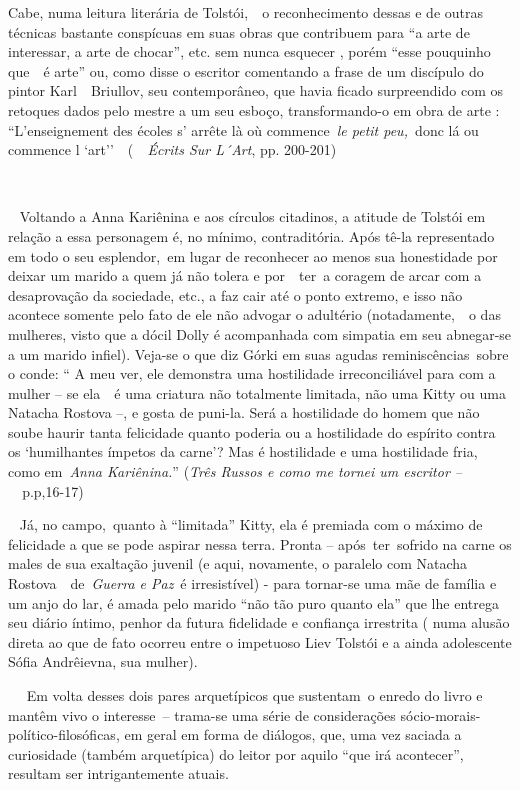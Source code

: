 Cabe, numa leitura literária de Tolstói,~~o reconhecimento dessas e de
outras técnicas bastante conspícuas em suas obras que contribuem para
``a arte de interessar, a arte de chocar'', etc. sem nunca esquecer ,
porém ``esse pouquinho que~~é arte'' ou, como disse o escritor
comentando a frase de um discípulo do pintor Karl~~Briullov, seu
contemporâneo, que havia ficado surpreendido com os retoques dados pelo
mestre a um seu esboço, transformando-o em obra de arte :
``L'enseignement des écoles s' arrête là où commence~\emph{le petit
peu,~}donc lá ou commence l `art''~~(~\emph{~Écrits Sur L´Art}, pp.
200-201)

~

~ Voltando a Anna Kariênina e aos círculos citadinos, a atitude de
Tolstói em relação a essa personagem é, no mínimo, contraditória. Após
tê-la representado em todo o seu esplendor,~em lugar de reconhecer ao
menos sua honestidade por deixar um marido a quem já não tolera e
por~~ter~a coragem de arcar com a desaprovação da sociedade, etc., a faz
cair até o ponto extremo, e isso não acontece somente pelo fato de ele
não advogar o adultério (notadamente,~~o das mulheres, visto que a dócil
Dolly é acompanhada com simpatia em seu abnegar-se a um marido infiel).
Veja-se o que diz Górki em suas agudas reminiscências~sobre o conde: ``
A meu ver, ele demonstra uma hostilidade irreconciliável para com a
mulher -- se ela~~é uma criatura não totalmente limitada, não uma Kitty
ou uma Natacha Rostova --, e gosta de puni-la. Será a hostilidade do
homem que não soube haurir tanta felicidade quanto poderia ou a
hostilidade do espírito contra os `humilhantes ímpetos da carne'? Mas é
hostilidade e uma hostilidade fria, como em~\emph{Anna Kariênina.}''
(\emph{Três Russos e como me tornei um escritor --~}~p.p,16-17)

\emph{~} Já, no campo,~quanto à ``limitada'' Kitty, ela é premiada com o
máximo de felicidade a que se pode aspirar nessa terra. Pronta --
após~ter~sofrido na carne os males de sua exaltação juvenil (e aqui,
novamente, o paralelo com Natacha Rostova~~de~\emph{Guerra e Paz}~é
irresistível) - para tornar-se uma mãe de família e um anjo do lar, é
amada pelo marido ``não tão puro quanto ela'' que lhe entrega seu diário
íntimo, penhor da futura fidelidade e confiança irrestrita ( numa alusão
direta ao que de fato ocorreu entre o impetuoso Liev Tolstói e a ainda
adolescente Sófia Andrêievna, sua mulher).

~~ Em volta desses dois pares arquetípicos que sustentam~o enredo do
livro e mantêm vivo o interesse~-- trama-se uma série de considerações
sócio-morais-político-filosóficas, em geral em forma de diálogos, que,
uma vez saciada a curiosidade (também arquetípica) do leitor por aquilo
``que irá acontecer'', resultam ser intrigantemente atuais.

